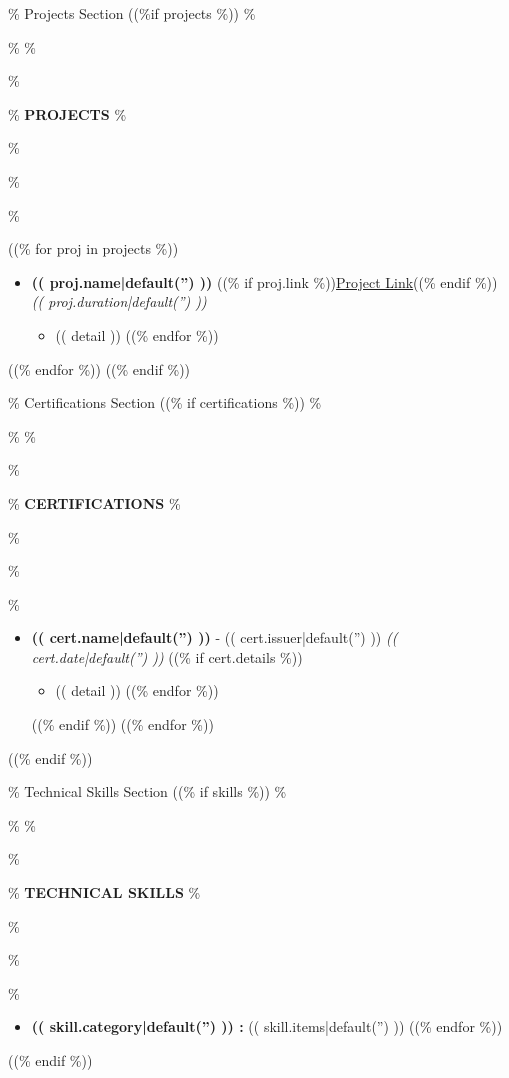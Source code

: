 \documentclass[a4paper,10pt]{article}
\newcommand{\lsep}{-0.5cm}
\newcommand{\resheading}[1]{\%
\par\noindent\%
\small\%
\colorbox{mygrey}{\%
\parbox{\dimexpr\linewidth-2\fboxsep\relax}{\%
\textbf{#1}\%
}\%
}\%
\par\nobreak\%
}
\begin{document}
\% Projects Section
((\%if projects \%))
\resheading{\textbf{PROJECTS} }
((\% for proj in projects \%))
\begin{itemize}
\vspace{-0.5mm}
\item {\bf (( proj.name|default('') )) } ((\% if proj.link \%))\href{ (( proj.link )) }{Project Link}((\% endif \%))
\textit{\hfill {(( proj.duration|default('') ))} }
\begin{itemize}
\vspace{-2mm}
((\% for detail in proj.details \%))
\item (( detail ))
((\% endfor \%))
\vspace{-2mm}
\end{itemize}
\end{itemize}
((\% endfor \%))
((\% endif \%))

\% Certifications Section
((\% if certifications \%))
\resheading{\textbf{CERTIFICATIONS} }\\[\lsep]
\begin{itemize}
((\% for cert in certifications \%))
\item {\bf (( cert.name|default('') )) } - (( cert.issuer|default('') )) \hfill \textit{ (( cert.date|default('') )) }
((\% if cert.details \%))
\begin{itemize}
((\% for detail in cert.details \%))
\item (( detail ))
((\% endfor \%))
\end{itemize}
((\% endif \%))
((\% endfor \%))
\end{itemize}
((\% endif \%))

\% Technical Skills Section
((\% if skills \%))
\resheading{\textbf{TECHNICAL SKILLS} }
\begin{itemize}
\vspace{-1mm}
((\% for skill in skills \%))
\item \textbf{ (( skill.category|default('') )) :} (( skill.items|default('') ))
\vspace{-1mm}
((\% endfor \%))
\vspace{-4mm}
\end{itemize}
((\% endif \%))
\end{document}
